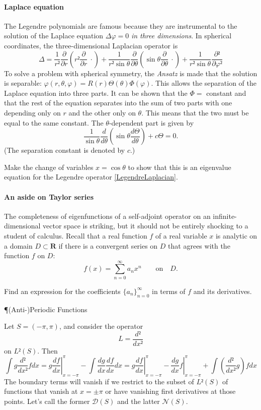 \paragraph{Laplace equation}
The Legendre polynomials are famous because they are instrumental to the solution of the Laplace equation $Δ 𝜑  =0$ {\em in three dimensions}. In spherical coordinates, the three-dimensional Laplacian operator is 
$$
Δ = \frac {1}{r²} \frac{∂}{∂r} \left( r² \frac{∂}{∂r}\ ⋅ \right) 
	+\frac{1}{r² \sin θ } \frac{∂}{∂θ} \left( \sin θ  \frac{∂}{∂θ}\ ⋅ \right) 
	+\frac{1}{r² \sin θ } \frac{∂²}{∂φ²} 
$$
To solve a problem with spherical symmetry, the {\it Ansatz} is made that the solution is separable: $𝜑(r, θ, φ) = R(r) Θ(θ) 𝛷(φ)$.
This allows the separation of the Laplace equation into three parts. It can be shown that the $𝛷=$ constant and that the rest of the equation separates into the sum of two parts with one depending only on $r$ and the other only on $θ$. This means that the two must be equal to the same constant. The $θ$-dependent part is given by
$$
\frac{1}{\sin θ } \frac{d}{dθ} \left( \sin θ  \frac{d Θ}{dθ} \right)  + c Θ = 0. 
$$
(The separation constant is denoted by $c$.)

\begin{exercise} 
Make the change of variables $x = \cos θ$ to show that this is an eigenvalue equation for the Legendre operator \eqref{LegendreLaplacian}.
\end{exercise}

\paragraph{An aside on Taylor series} 
The completeness of eigenfunctions of a self-adjoint operator on an infinite-dimensional vector space is striking, but it should not be entirely shocking to a student of calculus. Recall that a real function $f$ of a real variable $x$ is analytic on a domain $D⊂ 𝐑$ if there is a convergent series on $D$ that agrees with the function $f$ on $D$:
$$
f(x) = \sum_{n=0}^∞ a_n x^n \quad \quad \textrm{on}\quad D.
$$
\begin{exercise} 
Find an expression for the coefficients $\{a_n\}_{n=0}^∞$ in terms of $f$ and its derivatives. 
\end{exercise}


¶{(Anti-)Periodic Functions}


Let $S=(-π, π)$, and consider the operator
$$
L = \frac{d²}{dx²}
$$
on $L²(S)$. Then 
$$
\int g \frac{d²}{dx²} f dx 
= \left. g \frac{df}{dx} \right|_{x=-π}^π  - \int \frac{dg}{dx}\frac{df}{dx}  dx 
= \left. g \frac{df}{dx} \right|_{x=-π}^π  
	- \left. \frac{dg}{dx} f \right|_{x=-π}^π  
	+\int \left(\frac{d²}{dx²} g\right)  f dx 
$$
The boundary terms will vanish if we restrict to the subset of $L²(S)$ of functions that vanish at $x =± π$ or have vanishing first derivatives at those points. Let's call the former $𝒟 (S)$ and the latter $𝒩 (S)$.  

